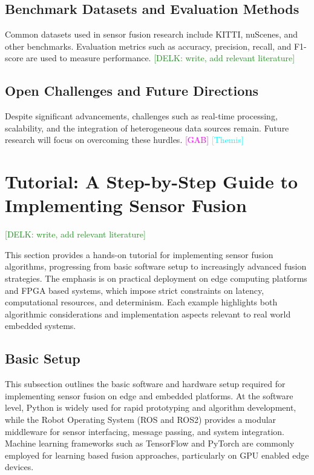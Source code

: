 \documentclass[journal]{IEEEtran}
\newcommand{\GO}[1]{\textcolor{magenta}{{#1}}}
\newcommand{\TC}[1]{\textcolor{cyan}{{#1}}}
\newcommand{\KD}[1]{\textcolor{ForestGreen}{{#1}}}
\begin{document}
\subsection{Benchmark Datasets and Evaluation Methods}
Common datasets used in sensor fusion research include KITTI, nuScenes, and other benchmarks. Evaluation metrics such as accuracy, precision, recall, and F1-score are used to measure performance.
\KD{[DELK: write, add relevant literature]}

\subsection{Open Challenges and Future Directions}
Despite significant advancements, challenges such as real-time processing, scalability, and the integration of heterogeneous data sources remain. Future research will focus on overcoming these hurdles.
\GO{[GAB]}
\TC{[Themis]}

\section{Tutorial: A Step-by-Step Guide to Implementing Sensor Fusion}

\KD{[DELK: write, add relevant literature]}

This section provides a hands-on tutorial for implementing sensor fusion algorithms, progressing from basic software setup to increasingly advanced fusion strategies. The emphasis is on practical deployment on edge computing platforms and FPGA based systems, which impose strict constraints on latency, computational resources, and determinism. Each example highlights both algorithmic considerations and implementation aspects relevant to real world embedded systems.

\subsection{Basic Setup}

This subsection outlines the basic software and hardware setup required for implementing sensor fusion on edge and embedded platforms. At the software level, Python is widely used for rapid prototyping and algorithm development, while the Robot Operating System (ROS and ROS2) provides a modular middleware for sensor interfacing, message passing, and system integration. Machine learning frameworks such as TensorFlow and PyTorch are commonly employed for learning based fusion approaches, particularly on GPU enabled edge devices.
\end{document}

